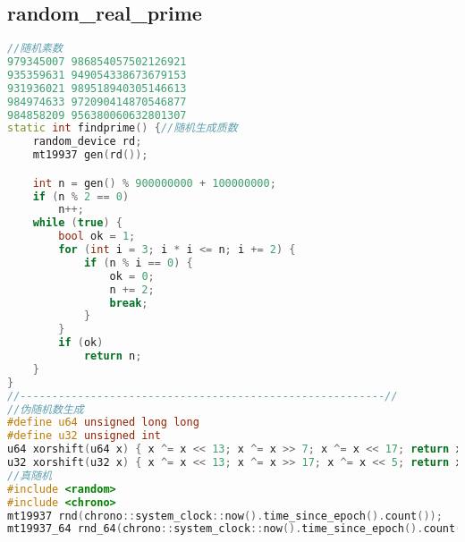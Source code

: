\subsection{random\_real\_prime}
\begin{lstlisting}[language=C++]
//随机素数
979345007 986854057502126921
935359631 949054338673679153
931936021 989518940305146613
984974633 972090414870546877
984858209 956380060632801307
static int findprime() {//随机生成质数
    random_device rd;
    mt19937 gen(rd());

    int n = gen() % 900000000 + 100000000;
    if (n % 2 == 0)
        n++;
    while (true) {
        bool ok = 1;
        for (int i = 3; i * i <= n; i += 2) {
            if (n % i == 0) {
                ok = 0;
                n += 2;
                break;
            }
        }
        if (ok)
            return n;
    }
}
//---------------------------------------------------------//
//伪随机数生成
#define u64 unsigned long long
#define u32 unsigned int
u64 xorshift(u64 x) { x ^= x << 13; x ^= x >> 7; x ^= x << 17; return x; }
u32 xorshift(u32 x) { x ^= x << 13; x ^= x >> 17; x ^= x << 5; return x; }
//真随机
#include <random>
#include <chrono>
mt19937 rnd(chrono::system_clock::now().time_since_epoch().count());
mt19937_64 rnd_64(chrono::system_clock::now().time_since_epoch().count());
\end{lstlisting}
